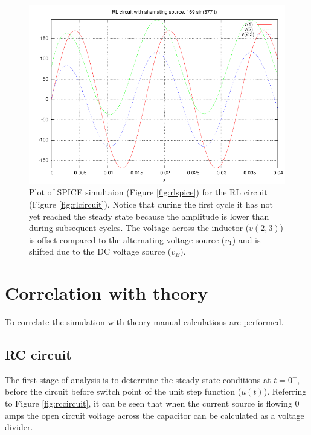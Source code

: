 \documentclass{article}
\begin{document}
\begin{figure}[!hbtp]
\center
\includegraphics[scale=1.0]{spice/rlplot-01}
\caption{Plot of SPICE simultaion (Figure \ref{fig:rlspice}) for
the RL circuit (Figure \ref{fig:rlcircuit}).
Notice that during the first cycle it has not yet reached the steady
state because the amplitude is lower than during subsequent cycles.
The voltage across the inductor ($v(2,3)$) is offset compared to the
alternating voltage source ($v_1$) and is shifted due to
the DC voltage source ($v_B$).}
\label{fig:rlplot1}
\end{figure}
\nocite{GNUPLOT}

\clearpage


\section{Correlation with theory}

To correlate the simulation with theory manual calculations are performed.

\subsection{RC circuit}

The first stage of analysis is to determine the steady state conditions
at $t = 0^-$, before the circuit before switch point of the
unit step function ($u(t)$).
Referring to Figure \ref{fig:rccircuit}, it can be seen that when the current
source is flowing 0 amps the open circuit voltage across the capacitor
can be calculated as a voltage divider.
\end{document}
